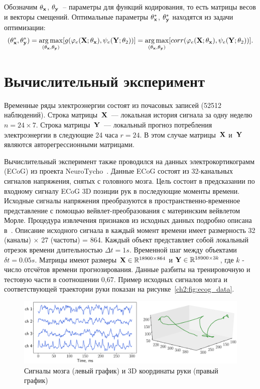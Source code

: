 Обозначим $\theta_{\mathbf{x}}$, $\theta_{\mathbf{y}}$~-- параметры для функций кодирования, то есть матрицы весов и векторы смещений. Оптимальные параметры $\theta_{\mathbf{x}}^{*}$, $\theta_{\mathbf{y}}^{*}$ находятся из задачи оптимизации:
\begin{equation}
(\theta_{\mathbf{x}}^{*}, \theta_{\mathbf{y}}^{*}) = \mathop{\arg \max}\limits _{(\theta_{\mathbf{x}}, \theta_{\mathbf{y}})} [g(\varphi_e(\mathbf{X}; \theta_{\mathbf{x}}), \psi_e(\mathbf{Y}; \theta_{2}))] = \mathop{\arg \max}\limits _{(\theta_{\mathbf{x}}, \theta_{\mathbf{y}})} [corr(\varphi_e(\mathbf{X}; \theta_{\mathbf{x}}), \psi_e(\mathbf{Y}; \theta_{2}))].
\end{equation}

\section{Вычислительный эксперимент}

Временные ряды электроэнергии состоят из почасовых записей (52512 наблюдений). 
Строка матрицы~$\mathbf{X}$~--– локальная история сигнала за одну неделю $n = 24 \times 7$. Строка матрицы~$\mathbf{Y}$~--- локальный прогноз потребления электроэнергии в следующие 24 часа $r = 24$. В этом случае матрицы~$\mathbf{X}$ и~$\mathbf{Y}$ являются авторегрессионными матрицами.

Вычислительный эксперимент также проводился на данных электрокортикограмм (ECoG) из проекта NeuroTycho~\cite{shimoda2012decoding}.
Данные ECoG состоят из 32-канальных сигналов напряжения, снятых с головного мозга.
Цель состоит в предсказании по входному сигналу ECoG 3D позиции рук в последующие моменты времени.
Исходные сигналы напряжения преобразуются в пространственно-временное представление с помощью вейвлет-преобразования с материнским вейвлетом Морле.
Процедура извлечения признаков из исходных данных подробно описана в~\cite{chao2010long,eliseyev2016penalized}.
Описание исходного сигнала в каждый момент времени имеет размерность 32 (каналы) $\times $ 27 (частоты) = 864.
Каждый объект представляет собой локальный отрезок времени длительностью $\Delta t = 1s$. Временной шаг между объектами $\delta t = 0.05 s$.
Матрицы имеют размеры $\mathbf{X} \in \mathbb{R}^{18900 \times 864}$ и $\mathbf{Y} \in \mathbb{R}^{18900 \times 3k}$, где $k$ - число отсчётов времени прогнозирования.
Данные разбиты на тренировочную и тестовую части в соотношении 0,67. 
Пример исходных сигналов мозга и соответствующей траектории руки показан на рисунке~\ref{ch2:fig:ecog_data}.

\begin{figure}
	\centering
	\includegraphics[width=\linewidth]{figs/ch2/ecog_data}
	\caption{Сигналы мозга (левый график) и 3D координаты руки (правый график)}
	\label{ch1:fig:ecog_data}
\end{figure}

